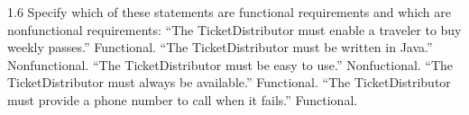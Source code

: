 1.6
Specify which of these statements are functional requirements and which are nonfunctional requirements:
“The TicketDistributor must enable a traveler to buy weekly passes.”	Functional.
“The TicketDistributor must be written in Java.”	Nonfunctional.
“The TicketDistributor must be easy to use.”	Nonfuctional.
“The TicketDistributor must always be available.”	Functional.
“The TicketDistributor must provide a phone number to call when it fails.”	Functional.